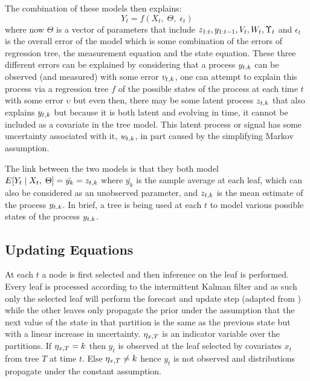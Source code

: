 The combination of these models then explains:
\[ Y_t = f(X_t,\; \Theta,\; \epsilon_t) \]
where now $\Theta$ is a vector of parameters that include ${z_{1:t}, y_{1:t-1}, V_t, W_t, \Upsilon_t}$ and $\epsilon_t$ is the overall error of the model which is some combination of the errors of regression tree, the measurement equation and the state equation. These three different errors can be explained by considering that a process $y_{t, k}$ can be observed (and measured) with some error $\textit{v}_{t, k}$, one can attempt to explain this process via a regression tree $f$ of the possible states of the process at each time $t$ with some error $\upsilon$ but even then, there may be some latent process $z_{t, k}$ that also explains $y_{t, k}$ but because it is both latent and evolving in time, it cannot be included as a covariate in the tree model. This latent process or signal has some uncertainty associated with it, $\textit{w}_{t, k}$, in part caused by the simplifying Markov assumption.

The link between the two models is that they both model $E[Y_t\;|\;X_t,\;\Theta] = \bar{y_k} = z_{t, k}$ where $\bar{y_k}$ is the sample average at each leaf, which can also be considered as an unobserved parameter, and $z_{t, k}$ is the mean estimate of the process $y_{t, k}$. In brief, a tree is being used at each $t$ to model various possible states of the process $y_{t, k}$. 

\subsection{Updating Equations}
At each $t$ a node is first selected and then inference on the leaf is performed. Every leaf is processed according to the intermittent Kalman filter \cite{sinopoli} and as such only the selected leaf will perform the forecast and update step (adapted from \cite{west}) while the other leaves only propagate the prior under the assumption that the next value of the state in that partition is the same as the previous state but with a linear increase in uncertainty. $\eta_{x, T}$ is an indicator variable over the partitions. If $\eta_{x, T} = k$ then $y_t$ is observed at the leaf selected by covariates $x_t$ from tree $T$ at time $t$. Else $\eta_{x, T} \neq k$ hence $y_t$ is not observed and distributions propagate under the constant assumption.
 
